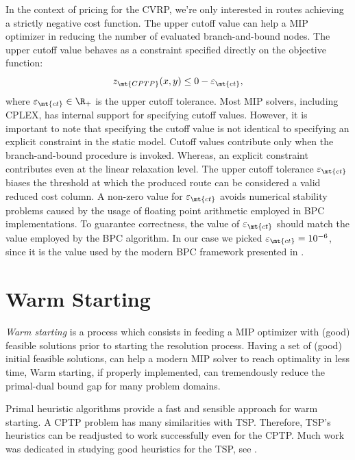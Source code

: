 In the context of pricing for the CVRP,
we're only interested in routes achieving a strictly negative cost function.
The upper cutoff value can help a MIP optimizer
in reducing the number of evaluated branch-and-bound nodes.
The upper cutoff value behaves as a constraint specified directly on the objective function:
\begin{equation}
	z_\mt{CPTP}(x, y) \le 0 - \varepsilon_{\mt{ct}},
\end{equation}
where $\varepsilon_{\mt{ct}} \in \R_+$ is the upper cutoff tolerance.
Most MIP solvers, including CPLEX, has internal support for specifying cutoff values.
However, it is important to note that specifying the cutoff value is not identical
to specifying an explicit constraint in the static model.
Cutoff values contribute only when the branch-and-bound procedure is invoked.
Whereas, an explicit constraint contributes even at the linear relaxation level.
The upper cutoff tolerance $\varepsilon_{\mt{ct}}$ biases the threshold at which the produced
route can be considered a valid reduced cost column.
A non-zero value for $\varepsilon_{\mt{ct}}$ avoids numerical
stability problems caused by the usage of floating point arithmetic
employed in BPC implementations.
To guarantee correctness, the value of $\varepsilon_{\mt{ct}}$ should match the
value employed by the BPC algorithm.
In our case we picked $\varepsilon_{\mt{ct}} = 10^{-6}$,
since it is the value used by the modern BPC framework presented in \textcite{sadykov2021}.

\section{Warm Starting}
\label{sec:impl-warm-starting}

\textit{Warm starting} is a process which consists in feeding
a MIP optimizer with (good) feasible solutions
prior to starting the resolution process.
Having a set of (good) initial feasible solutions,
can help a modern MIP solver to reach optimality in less time,
Warm starting, if properly implemented,
can tremendously reduce the primal-dual bound gap for many problem domains.

Primal heuristic algorithms provide a fast and sensible approach for warm starting.
A CPTP problem has many similarities with TSP.
Therefore,
TSP's heuristics can be readjusted to work successfully even for the CPTP.
Much work was dedicated in studying good heuristics for the TSP,
see \cite{rosenkrantz1977, johnson1997, laporte1992, johnson2007, hoffman2013}.

